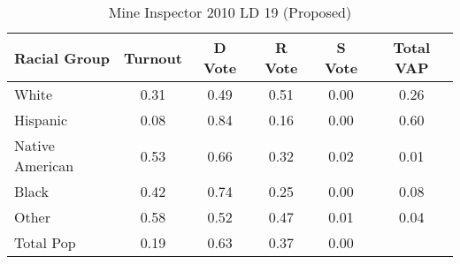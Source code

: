 \begin{table}[htb]
\begin{center}
\caption{Mine Inspector 2010 LD 19 (Proposed)}
\label{smine_vap_ld_19}
\begin{tabular}{lccccc}
  \hline
Racial Group & Turnout & D Vote & R Vote & S Vote & Total VAP \\ 
  \hline
White & 0.31 & 0.49 & 0.51 & 0.00 & 0.26 \\ 
  Hispanic & 0.08 & 0.84 & 0.16 & 0.00 & 0.60 \\ 
  Native American & 0.53 & 0.66 & 0.32 & 0.02 & 0.01 \\ 
  Black & 0.42 & 0.74 & 0.25 & 0.00 & 0.08 \\ 
  Other & 0.58 & 0.52 & 0.47 & 0.01 & 0.04 \\ 
  Total Pop & 0.19 & 0.63 & 0.37 & 0.00 &  \\ 
   \hline
\end{tabular}
\end{center}
\end{table}
